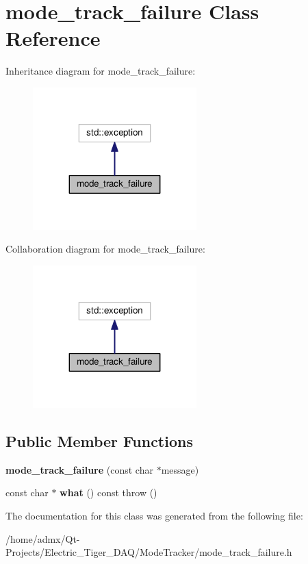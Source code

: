 \hypertarget{classmode__track__failure}{\section{mode\+\_\+track\+\_\+failure Class Reference}
\label{classmode__track__failure}
}


Inheritance diagram for mode\+\_\+track\+\_\+failure\+:\nopagebreak
\begin{figure}[H]
\begin{center}
\leavevmode
\includegraphics[width=179pt]{classmode__track__failure__inherit__graph}
\end{center}
\end{figure}


Collaboration diagram for mode\+\_\+track\+\_\+failure\+:\nopagebreak
\begin{figure}[H]
\begin{center}
\leavevmode
\includegraphics[width=179pt]{classmode__track__failure__coll__graph}
\end{center}
\end{figure}
\subsection*{Public Member Functions}
\begin{DoxyCompactItemize}
\item 
\hypertarget{classmode__track__failure_a3636c3b5e513a98e420d7b769803fb07}{{\bfseries mode\+\_\+track\+\_\+failure} (const char $\ast$message)}\label{classmode__track__failure_a3636c3b5e513a98e420d7b769803fb07}

\item 
\hypertarget{classmode__track__failure_a9a6a0afd0b4b1f675d5e3ab17313d937}{const char $\ast$ {\bfseries what} () const   throw ()}\label{classmode__track__failure_a9a6a0afd0b4b1f675d5e3ab17313d937}

\end{DoxyCompactItemize}


The documentation for this class was generated from the following file\+:\begin{DoxyCompactItemize}
\item 
/home/admx/\+Qt-\/\+Projects/\+Electric\+\_\+\+Tiger\+\_\+\+D\+A\+Q/\+Mode\+Tracker/mode\+\_\+track\+\_\+failure.\+h\end{DoxyCompactItemize}
